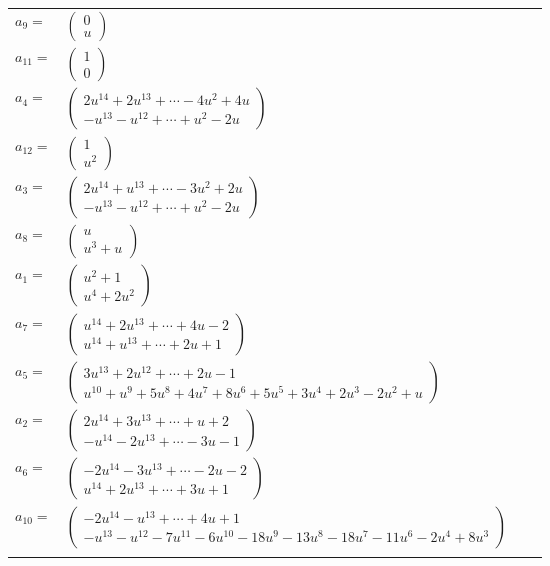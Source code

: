 \documentclass[1p]{elsarticle_modified}
\theoremstyle{definition}
\begin{document}
\begin{tabular}{m{7pt} m{180pt} m{7pt} m{180pt} }
\flushright $a_{9}=$&$\begin{pmatrix}0\\u\end{pmatrix}$ \\
\flushright $a_{11}=$&$\begin{pmatrix}1\\0\end{pmatrix}$ \\
\flushright $a_{4}=$&$\begin{pmatrix}2 u^{14}+2 u^{13}+\cdots-4 u^2+4 u\\- u^{13}- u^{12}+\cdots+u^2-2 u\end{pmatrix}$ \\
\flushright $a_{12}=$&$\begin{pmatrix}1\\u^2\end{pmatrix}$ \\
\flushright $a_{3}=$&$\begin{pmatrix}2 u^{14}+u^{13}+\cdots-3 u^2+2 u\\- u^{13}- u^{12}+\cdots+u^2-2 u\end{pmatrix}$ \\
\flushright $a_{8}=$&$\begin{pmatrix}u\\u^3+u\end{pmatrix}$ \\
\flushright $a_{1}=$&$\begin{pmatrix}u^2+1\\u^4+2 u^2\end{pmatrix}$ \\
\flushright $a_{7}=$&$\begin{pmatrix}u^{14}+2 u^{13}+\cdots+4 u-2\\u^{14}+u^{13}+\cdots+2 u+1\end{pmatrix}$ \\
\flushright $a_{5}=$&$\begin{pmatrix}3 u^{13}+2 u^{12}+\cdots+2 u-1\\u^{10}+u^9+5 u^8+4 u^7+8 u^6+5 u^5+3 u^4+2 u^3-2 u^2+u\end{pmatrix}$ \\
\flushright $a_{2}=$&$\begin{pmatrix}2 u^{14}+3 u^{13}+\cdots+u+2\\- u^{14}-2 u^{13}+\cdots-3 u-1\end{pmatrix}$ \\
\flushright $a_{6}=$&$\begin{pmatrix}-2 u^{14}-3 u^{13}+\cdots-2 u-2\\u^{14}+2 u^{13}+\cdots+3 u+1\end{pmatrix}$ \\
\flushright $a_{10}=$&$\begin{pmatrix}-2 u^{14}- u^{13}+\cdots+4 u+1\\- u^{13}- u^{12}-7 u^{11}-6 u^{10}-18 u^9-13 u^8-18 u^7-11 u^6-2 u^4+8 u^3\end{pmatrix}$\\&\end{tabular}
\end{document}
